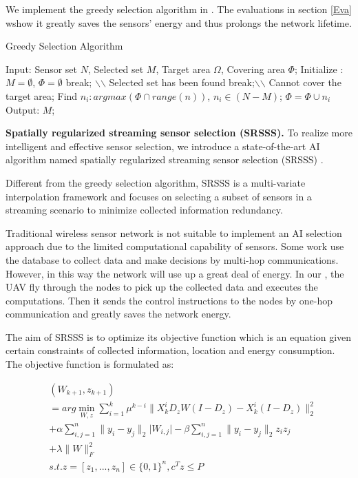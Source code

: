 We implement the greedy selection algorithm in {\sdn}. The evaluations in section \ref{Eva} 
wshow it greatly saves the sensors' energy and thus prolongs the network lifetime.

\begin{algorithm}
\caption{Greedy Selection Algorithm}
\label{Greedy}
\begin{algorithmic}[1]
\STATE Input: Sensor set $N$, Selected set $M$, Target area $\Omega$, Covering area $\Phi$;
\STATE Initialize : $M = \emptyset$, $\Phi = \emptyset$
    \IF{$\Phi = \Omega $}
        \STATE break; $\backslash$$\backslash$ Selected set has been found
    \ENDIF
    	 \STATE break;$\backslash$$\backslash$ Cannot cover the target area;
    \ENDIF
    \STATE Find $n_i : argmax(\Phi \cap range(n))$, $n_i \in (N-M)$;
    \STATE $\Phi = \Phi \cup {n_i}$
\ENDWHILE
\STATE Output: $M$;
\end{algorithmic}
\end{algorithm}

\textbf{Spatially regularized streaming sensor selection (SRSSS).} 
To realize more intelligent and effective sensor selection, we introduce 
a state-of-the-art AI algorithm named spatially regularized streaming 
sensor selection (SRSSS) \cite{li2016spatially}.

Different from the greedy selection algorithm, SRSSS is a multi-variate 
interpolation framework and focuses on selecting a subset
of sensors in a streaming scenario to minimize collected information redundancy.  

Traditional wireless sensor network is not suitable to implement an AI selection approach
due to the limited computational capability of sensors. Some work use the database to collect data
and make decisions by multi-hop communications. However, in this way the network will use up a great deal of energy.
In our {\sdn}, the UAV fly through the nodes to pick up the collected data and executes the computations.
Then it sends the control instructions to the nodes by one-hop communication and greatly saves the network energy.

The aim of SRSSS is to optimize its objective function which is an equation given
certain constraints of collected information, location and energy consumption.
The objective function is formulated as:

\begin{equation}
\label{OF}
\begin{aligned}
& (W_{k+1},z_{k+1})  \\
& = arg \min_{W,z} \sum_{i=1}^k \mu^{k-i}\lVert X_k^iD_zW(I-D_z)-X_k^i(I-D_z)\rVert^2_2 \\
& + \alpha\sum_{i,j=1}^n\lVert y_i-y_j\rVert_2\lvert W_{i,j} \rvert - \beta\sum_{i,j=1}^n\lVert y_i-y_j\rVert_2 z_iz_j \\
& + \lambda\lVert W \rVert^2_F \\
&s.t. z = [z_1,...,z_n] \in {\{0,1\}}^n, c^Tz \leq P
\end{aligned}
\end{equation}

